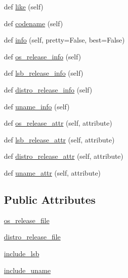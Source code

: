 \begin{DoxyCompactItemize}
\item 
def \hyperlink{classpip_1_1__vendor_1_1distro_1_1LinuxDistribution_a65bc00eb33209666ff0bda45659b31fe}{like} (self)
\item 
def \hyperlink{classpip_1_1__vendor_1_1distro_1_1LinuxDistribution_a8b01fa5c9b2883dab710ca528927a6d2}{codename} (self)
\item 
def \hyperlink{classpip_1_1__vendor_1_1distro_1_1LinuxDistribution_a8d936e9ec6198181f15f5b1bf07f065d}{info} (self, pretty=False, best=False)
\item 
def \hyperlink{classpip_1_1__vendor_1_1distro_1_1LinuxDistribution_ae22f1ae28f0b6f8a20b0ffd3ddea6af6}{os\+\_\+release\+\_\+info} (self)
\item 
def \hyperlink{classpip_1_1__vendor_1_1distro_1_1LinuxDistribution_afe0f672a343886952d8810433847a07f}{lsb\+\_\+release\+\_\+info} (self)
\item 
def \hyperlink{classpip_1_1__vendor_1_1distro_1_1LinuxDistribution_a1d9126e8fcc8d24aacdbeb300fa94424}{distro\+\_\+release\+\_\+info} (self)
\item 
def \hyperlink{classpip_1_1__vendor_1_1distro_1_1LinuxDistribution_a86202dc77ae2ed3fa849d58ef54a9179}{uname\+\_\+info} (self)
\item 
def \hyperlink{classpip_1_1__vendor_1_1distro_1_1LinuxDistribution_a2c980e7f2faf33563d32e0a0b1309cfa}{os\+\_\+release\+\_\+attr} (self, attribute)
\item 
def \hyperlink{classpip_1_1__vendor_1_1distro_1_1LinuxDistribution_a2fb20b28b68f25e4868e8d4b517bb710}{lsb\+\_\+release\+\_\+attr} (self, attribute)
\item 
def \hyperlink{classpip_1_1__vendor_1_1distro_1_1LinuxDistribution_a783e432baf3c43e5c59d94715abe882d}{distro\+\_\+release\+\_\+attr} (self, attribute)
\item 
def \hyperlink{classpip_1_1__vendor_1_1distro_1_1LinuxDistribution_a82939a6850962797338a64083a30a2ec}{uname\+\_\+attr} (self, attribute)
\end{DoxyCompactItemize}
\subsection*{Public Attributes}
\begin{DoxyCompactItemize}
\item 
\hyperlink{classpip_1_1__vendor_1_1distro_1_1LinuxDistribution_affacba40460a4f69535a5d4fef9fef8f}{os\+\_\+release\+\_\+file}
\item 
\hyperlink{classpip_1_1__vendor_1_1distro_1_1LinuxDistribution_aba99e38b84002f3378072a4c916fad47}{distro\+\_\+release\+\_\+file}
\item 
\hyperlink{classpip_1_1__vendor_1_1distro_1_1LinuxDistribution_a7ecb7e06b4f56986219d9c00106a188b}{include\+\_\+lsb}
\item 
\hyperlink{classpip_1_1__vendor_1_1distro_1_1LinuxDistribution_af0fda24c21eb8e75a4552b7e842f1521}{include\+\_\+uname}
\end{DoxyCompactItemize}


